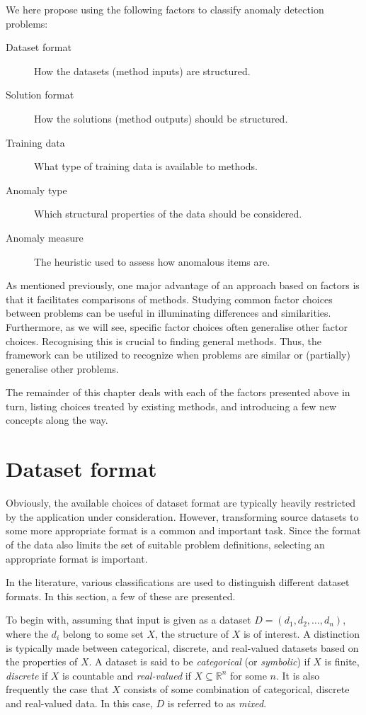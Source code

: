 We here propose using the following factors to classify anomaly detection problems:
\begin{description}
  \item[Dataset format] How the datasets (method inputs) are structured.
  \item[Solution format] How the solutions (method outputs) should be structured.
  \item[Training data] What type of training data is available to methods.
  \item[Anomaly type] Which structural properties of the data should be considered.
  \item[Anomaly measure] The heuristic used to assess how anomalous items are.
\end{description}
As mentioned previously, one major advantage of an approach based on factors is that it facilitates comparisons of methods. Studying common factor choices between problems can be useful in illuminating differences and similarities. Furthermore, as we will see, specific factor choices often generalise other factor choices. Recognising this is crucial to finding general methods. Thus, the framework can be utilized to recognize when problems are similar or (partially) generalise other problems.

The remainder of this chapter deals with each of the factors presented above in turn, listing choices treated by existing methods, and introducing a few new concepts along the way.

\section{Dataset format}
\label{sect:data_format}

Obviously, the available choices of dataset format are typically heavily restricted by the application under consideration. However, transforming source datasets to some more appropriate format is a common and important task. Since the format of the data also limits the set of suitable problem definitions, selecting an appropriate format is important.

In the literature, various classifications are used to distinguish different dataset formats. In this section, a few of these are presented.

To begin with, assuming that input is given as a dataset $D = (d_1, d_2, \dots, d_n)$, where the $d_i$ belong to some set $X$, the structure of $X$ is of interest. A distinction is typically made between categorical, discrete, and real-valued datasets based on the properties of $X$. A dataset is said to be \emph{categorical} (or \emph{symbolic}) if $X$ is finite, \emph{discrete} if $X$ is countable and \emph{real-valued} if $X \subseteq \mathbb{R}^n$ for some $n$. It is also frequently the case that $X$ consists of some combination of categorical, discrete and real-valued data. In this case, $D$ is referred to as \emph{mixed}.

